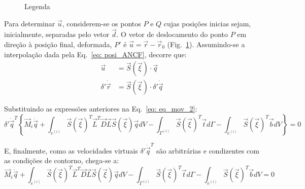 \begin{figure}[h]
 \centering
 
 \caption{Legenda}
 \label{fig: campo_deslocamentos}
\end{figure}


Para determinar $\vec{u}$, considerem-se os pontos $P$ e $Q$ cujas posições inicias sejam, inicialmente, 
separadas pelo vetor $\vec{d}$. O vetor de deslocamento do ponto $P$ em direção à posição final, deformada,
$P'$ é $\vec{u}=\vec{r}-\vec{r}_0$ (Fig.~\ref{fig: campo_deslocamentos}). Assumindo-se a interpolação dada pela Eq.~\eqref{eq: posi_ANCF}, decorre que:
\begin{align}
    \vec{u} &= \vec{S}(\vec{\xi})\cdot\vec{q} \label{eq: campo_desl_ANCF} \\
    \delta'\dot{\vec{r}} &= \vec{S}(\vec{\xi})\cdot\delta'\dot{\vec{q}} \label{eq: var_velocidades_ANCF}
\end{align}

Substituindo as expressões anteriores na Eq.~\eqref{eq: eq_mov_2}:
\begin{equation}
     \delta'\dot{\vec{q}}^T \left\lbrace \vec{M}_i \ddot{\vec{q}} + 
    \int_{e^{(i)}}{ \vec{S}(\vec{\xi})^T \vec{L}^T \vec{D}\vec{L}\vec{S}(\vec{\xi})\vec{q}  dV}
    - \int_{\Gamma^{(i)}}{\vec{S}(\vec{\xi})^T \vec{t} d\Gamma} 
    - \int_{e^{(i)}}{\vec{S}(\vec{\xi})^T \vec{b} dV}\right\rbrace = 0  \label{eq: eq_mov_3}
\end{equation}

E, finalmente, como as velocidades virtuais $\delta'\dot{\vec{q}}^T$ são arbitrárias e condizentes com as 
condições de contorno, chega-se a:
\begin{equation}
     \vec{M}_i \ddot{\vec{q}} + 
    \int_{e^{(i)}}{ \vec{S}(\vec{\xi})^T \vec{L}^T \vec{D}\vec{L}\vec{S}(\vec{\xi})\vec{q}  dV}
    - \int_{\Gamma^{(i)}}{\vec{S}(\vec{\xi})^T \vec{t} d\Gamma} 
    - \int_{e^{(i)}}{\vec{S}(\vec{\xi})^T \vec{b} dV} = 0  \label{eq: eq_mov_4}
\end{equation}

